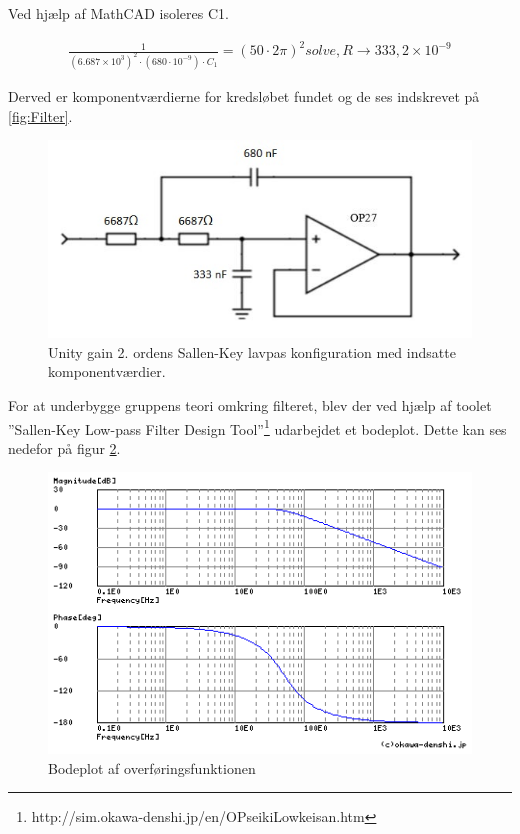 Ved hjælp af MathCAD isoleres C1. 

\begin{align}
	\frac{1}{(6.687\times 10^{3})^{2}\cdot(680\cdot10^{-9})\cdot C_1}=(50\cdot 2\pi)^{2} solve, R \to 333,2\times 10^{-9}
\end{align}

Derved er komponentværdierne for kredsløbet fundet og de ses indskrevet på \ref{fig:Filter}. 

\begin{figure}[H]
	\centering
	\includegraphics[width=1\textwidth]{Figurer/Hardware/FilterDesignMedKomponentvaerdier}
	\caption{Unity gain 2. ordens Sallen-Key lavpas konfiguration med indsatte komponentværdier.}
	\label{fig:Filter_K}
\end{figure}

For at underbygge gruppens teori omkring filteret, blev der ved hjælp af toolet ”Sallen-Key Low-pass Filter Design Tool”\footnote{http://sim.okawa-denshi.jp/en/OPseikiLowkeisan.htm} udarbejdet et bodeplot. Dette kan ses nedefor på figur \ref{fig:Bodeplot}. 

\begin{figure}[H]
	\centering
	\includegraphics[width=1\textwidth]{Figurer/Hardware/Bodeplot}
	\caption[]{Bodeplot af overføringsfunktionen\footnotemark}
	\label{fig:Bodeplot}
\end{figure}


